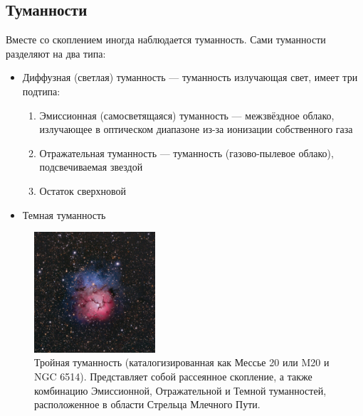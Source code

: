 \documentclass{beamer}
\begin{document}
    \subsection*{Туманности}
    \begin{frame}
        Вместе со скоплением иногда наблюдается туманность. Сами туманности разделяют на два типа:
        \begin{itemize}
            \item Диффузная (светлая) туманность --- туманность излучающая свет, имеет три подтипа:
            \begin{enumerate}
                \item Эмиссионная (самосветящаяся) туманность --- межзвёздное облако, излучающее в оптическом диапазоне из-за ионизации собственного газа
                \item Отражательная туманность --- туманность (газово-пылевое облако), подсвечиваемая звездой
                \item Остаток сверхновой
            \end{enumerate}
            \item Темная туманность
        \end{itemize}
    \end{frame}
    \begin{frame}
        \begin{figure}
            \centering
            \includegraphics[width=0.4\textwidth]{pictures/Nebula.jpg}
            \caption{Тройная туманность (каталогизированная как Мессье 20 или M20 и NGC 6514). Представляет собой рассеянное скопление,
            а также комбинацию Эмиссионной, Отражательной и Темной туманностей, расположенное в области Стрельца Млечного Пути.}
        \end{figure}
    \end{frame}
\end{document}
